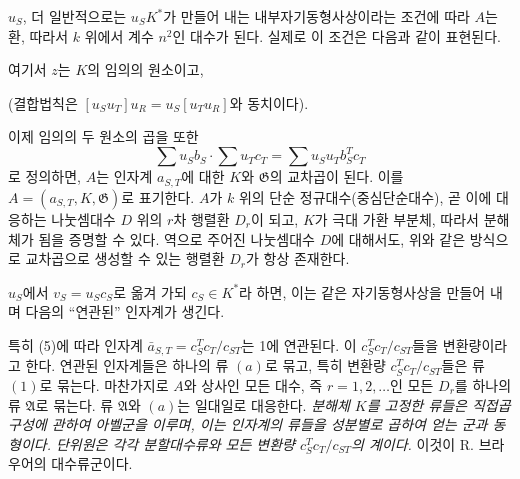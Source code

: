 

\(u_S\), 더 일반적으로는 \(u_SK^*\)가 만들어 내는 내부자기동형사상이라는 조건에 따라 \(A\)는 환, 따라서 \(k\) 위에서 계수 \(n^2\)인 대수가 된다. 실제로 이 조건은 다음과 같이 표현된다.


여기서 \(z\)는 \(K\)의 임의의 원소이고,



(결합법칙은 \([u_Su_T]u_R=u_S[u_Tu_R]\)와 동치이다).

이제 임의의 두 원소의 곱을 또한
\[
\sum u_Sb_S\cdot\sum u_Tc_T=\sum u_Su_Tb_S^Tc_T
\]
로 정의하면, \(A\)는 인자계 \(a_{S,T}\)에 대한 \(K\)와 \(\mathfrak G\)의 교차곱이 된다. 이를 \(A=(a_{S,T},K,\mathfrak G)\)로 표기한다. \(A\)가 \(k\) 위의 단순 정규대수(중심단순대수), 곧 이에 대응하는 나눗셈대수 \(D\) 위의 \(r\)차 행렬환 \(D_r\)이 되고, \(K\)가 극대 가환 부분체, 따라서 분해체가 됨을 증명할 수 있다. 역으로 주어진 나눗셈대수 \(D\)에 대해서도, 위와 같은 방식으로 교차곱으로 생성할 수 있는 행렬환 \(D_r\)가 항상 존재한다.

\(u_S\)에서 \(v_S=u_Sc_S\)로 옮겨 가되 \(c_S\in K^*\)라 하면, 이는 같은 자기동형사상을 만들어 내며 다음의 ``연관된'' 인자계가 생긴다.


특히 (5)에 따라 인자계 \(\bar a_{S,T}=c_S^Tc_T/c_{ST}\)는 1에 연관된다. 이 \(c_S^Tc_T/c_{ST}\)들을 변환량이라고 한다. 연관된 인자계들은 하나의 류 \((a)\)로 묶고, 특히 변환량 \(c_S^Tc_T/c_{ST}\)들은 류 \((1)\)로 묶는다. 마찬가지로 \(A\)와 상사인 모든 대수, 즉 \(r=1,2,\ldots\)인 모든 \(D_r\)를 하나의 류 \(\mathfrak A\)로 묶는다. 류 \(\mathfrak A\)와 \((a)\)는 일대일로 대응한다. \emph{분해체 \(K\)를 고정한 류들은 직접곱 구성에 관하여 아벨군을 이루며, 이는 인자계의 류들을 성분별로 곱하여 얻는 군과 동형이다. 단위원은 각각 분할대수류와 모든 변환량 \(c_S^Tc_T/c_{ST}\)의 계이다.} 이것이 R. 브라우어의 대수류군이다.
